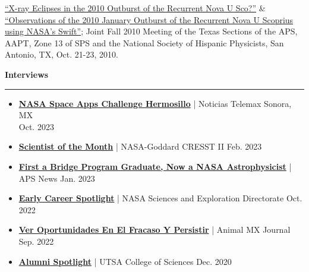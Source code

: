 \documentclass[12pt]{article}
\begin{document}
\begin{etaremune}
\item \href{http://adsabs.harvard.edu/abs/2010APS..TSFFP1019V}{“X-ray Eclipses in the 2010 Outburst of the Recurrent Nova U Sco?”} \&  \href{http://adsabs.harvard.edu/abs/2010APS..TSFFP1013M}{“Observations of the 2010 January Outburst of the Recurrent Nova U Scoprius using NASA's Swift”}; Joint Fall 2010 Meeting of the Texas Sections of the APS, AAPT, Zone 13 of SPS and the National Society of Hispanic Physicists, San Antonio, TX, Oct. 21-23, 2010.

\end{etaremune}

\bigskip
\noindent
{\bf Interviews} \\
\vspace{-10mm}
\begin{center}
\rule{\textwidth}{0.2mm}
\end{center}
\vspace{-3mm}
\begin{itemize}
    \setlength{\itemsep}{0pt} %
    \item \textbf{\href{https://fb.watch/nBDyaBPEFK/?mibextid=Nif5oz}{NASA Space Apps Challenge Hermosillo}} | Noticias Telemax Sonora, MX \hfill \\ Oct. 2023
    \item \textbf{\href{https://cresst2.umd.edu/scientistofmonth/February2023-Vega_Laura.pdf}{Scientist of the Month}} | NASA-Goddard CRESST II \hfill Feb. 2023
    \item \textbf{\href{https://www.aps.org/apsnews/2022/12/bridge-program-nasa}{First a Bridge Program Graduate, Now a NASA Astrophysicist}} | APS News \hfill Jan. 2023
    \item \textbf{\href{https://science.gsfc.nasa.gov/600/ECSS/Laura-Vega.html}{Early Career Spotlight}} | NASA Sciences and Exploration Directorate \hfill Oct. 2022
    \item \textbf{\href{https://animalpolitico.com/tendencias/ciencia-tecnologia/mexicanos-en-la-nasa-entrevista-laura-vega-fernando-mier-hicks}{Ver Oportunidades En El Fracaso Y Persistir}} | Animal MX Journal \hfill Sep. 2022
    \item \textbf{\href{https://sciences.utsa.edu/spotlights/alumni/2020/laura-vega.html}{Alumni Spotlight}} | UTSA College of Sciences \hfill Dec. 2020
\end{itemize}
\end{document}

